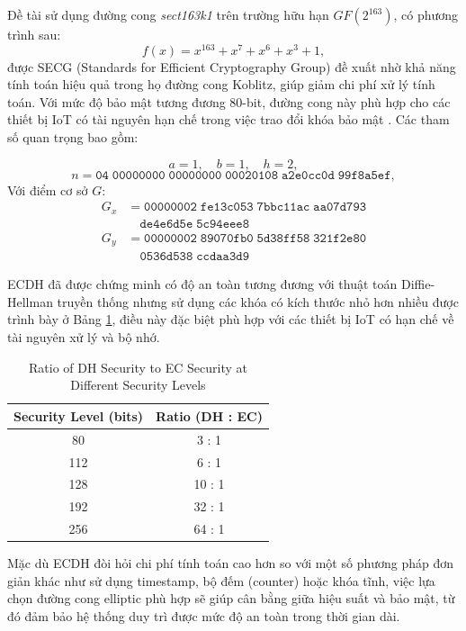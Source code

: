 Đề tài sử dụng đường cong \textit{sect163k1} trên trường hữu hạn $GF(2^{163})$, có phương trình sau:
\[
f(x) = x^{163} + x^7 + x^6 + x^3 + 1,
\]
được SECG (Standards for Efficient Cryptography Group) đề xuất nhờ khả năng tính toán hiệu quả trong họ đường cong Koblitz, giúp giảm chi phí xử lý tính toán. Với mức độ bảo mật tương đương 80-bit, đường cong này phù hợp cho các thiết bị IoT có tài nguyên hạn chế trong việc trao đổi khóa bảo mật \cite{secg}. Các tham số quan trọng bao gồm:

\[
a = 1, \quad b = 1, \quad h = 2,
\]
\[
n = \mathtt{04\; 00000000\; 00000000\; 00020108\; a2e0cc0d\; 99f8a5ef},
\]
Với điểm cơ sở \(G\):
\[
\begin{aligned}
G_x &= \mathtt{00000002\; fe13c053\; 7bbc11ac\; aa07d793} \\
    &\quad \mathtt{de4e6d5e\; 5c94eee8} \\
G_y &= \mathtt{00000002\; 89070fb0\; 5d38ff58\; 321f2e80} \\
    &\quad \mathtt{0536d538\; ccdaa3d9}
\end{aligned}
\]

ECDH đã được chứng minh có độ an toàn tương đương với thuật toán Diffie-Hellman truyền thống nhưng sử dụng các khóa có kích thước nhỏ hơn nhiều \cite{ecc-review} được trình bày ở Bảng \ref{tab:dh_ec_security}, điều này đặc biệt phù hợp với các thiết bị IoT có hạn chế về tài nguyên xử lý và bộ nhớ.

\begin{table}[h]
\centering
\small
\caption{Ratio of DH Security to EC Security at Different Security Levels}
\label{tab:dh_ec_security}
\begin{tabular}{|c|c|}
\hline
\textbf{Security Level (bits)} & \textbf{Ratio (DH : EC)} \\
\hline
80  & 3 : 1  \\
\hline
112 & 6 : 1  \\
\hline
128 & 10 : 1 \\
\hline
192 & 32 : 1 \\
\hline
256 & 64 : 1 \\
\hline
\end{tabular}
\end{table}

Mặc dù ECDH đòi hỏi chi phí tính toán cao hơn so với một số phương pháp đơn giản khác như sử dụng timestamp, bộ đếm (counter) hoặc khóa tĩnh, việc lựa chọn đường cong elliptic phù hợp sẽ giúp cân bằng giữa hiệu suất và bảo mật, từ đó đảm bảo hệ thống duy trì được mức độ an toàn trong thời gian dài.

